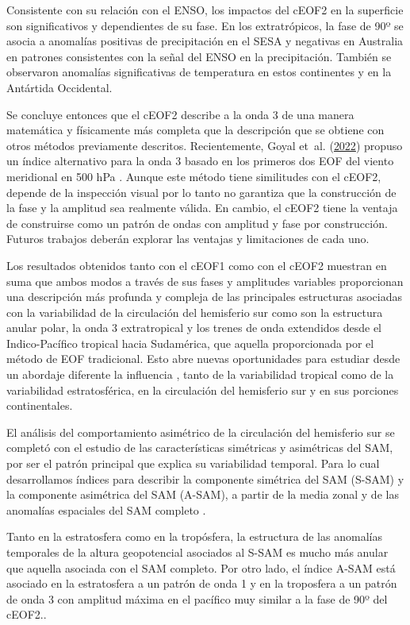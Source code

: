 \documentclass[12pt,oneside,a4paper]{reedthesis}
\begin{document}
Consistente con su relación con el ENSO, los impactos del cEOF2 en la superficie son significativos y dependientes de su fase.
En los extratrópicos, la fase de 90º se asocia a anomalías positivas de precipitación en el SESA y negativas en Australia en patrones consistentes con la señal del ENSO en la precipitación.
También se observaron anomalías significativas de temperatura en estos continentes y en la Antártida Occidental.

Se concluye entonces que el cEOF2 describe a la onda 3 de una manera matemática y físicamente más completa que la descripción que se obtiene con otros métodos previamente descritos.
Recientemente, Goyal et~al. (\protect\hyperlink{ref-goyal2022}{2022}) propuso un índice alternativo para la onda 3 basado en los primeros dos EOF del viento meridional en 500 hPa .
Aunque este método tiene similitudes con el cEOF2, depende de la inspección visual por lo tanto no garantiza que la construcción de la fase y la amplitud sea realmente válida.
En cambio, el cEOF2 tiene la ventaja de construirse como un patrón de ondas con amplitud y fase por construcción.
Futuros trabajos deberán explorar las ventajas y limitaciones de cada uno.

Los resultados obtenidos tanto con el cEOF1 como con el cEOF2 muestran en suma que ambos modos a través de sus fases y amplitudes variables proporcionan una descripción más profunda y compleja de las principales estructuras asociadas con la variabilidad de la circulación del hemisferio sur como son la estructura anular polar, la onda 3 extratropical y los trenes de onda extendidos desde el Indico-Pacífico tropical hacia Sudamérica, que aquella proporcionada por el método de EOF tradicional.
Esto abre nuevas oportunidades para estudiar desde un abordaje diferente la influencia , tanto de la variabilidad tropical como de la variabilidad estratosférica, en la circulación del hemisferio sur y en sus porciones continentales.

El análisis del comportamiento asimétrico de la circulación del hemisferio sur se completó con el estudio de las características simétricas y asimétricas del SAM, por ser el patrón principal que explica su variabilidad temporal.
Para lo cual desarrollamos índices para describir la componente simétrica del SAM (S-SAM) y la componente asimétrica del SAM (A-SAM), a partir de la media zonal y de las anomalías espaciales del SAM completo .

Tanto en la estratosfera como en la tropósfera, la estructura de las anomalías temporales de la altura geopotencial asociados al S-SAM es mucho más anular que aquella asociada con el SAM completo.
Por otro lado, el índice A-SAM está asociado en la estratosfera a un patrón de onda 1 y en la troposfera a un patrón de onda 3 con amplitud máxima en el pacífico muy similar a la fase de 90º del cEOF2..
\end{document}
